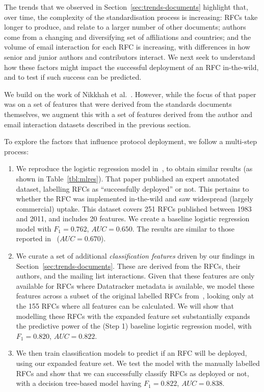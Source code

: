 \documentclass[twocolumn,10pt]{article}
\begin{document}

The trends that we observed in Section~\ref{sec:trends-documents}
highlight that, over time, the complexity of the standardisation process is
increasing: RFCs take longer to produce, and relate to a larger number of
other documents; authors come from a changing and diversifying set of
affiliations and countries; and the volume of email interaction for each
RFC is increasing, with differences in how senior and junior authors and
contributors interact.  We next seek to understand how these factors might
impact the successful deployment of an RFC in-the-wild, and to test if such
success can be predicted.


We build on the work of Nikkhah et al.~\cite{nikkhah2017statistical}.
However, while the focus of that paper was on a set of features that were
derived from the standards documents themselves, we augment this with a set
of features derived from the author and email interaction datasets
described in the previous section.

To explore the factors that influence protocol deployment, we follow a
multi-step process:
\begin{enumerate}
  \item We reproduce the logistic regression model in~\cite{nikkhah2017statistical},
    to obtain similar results (as shown in Table~\ref{tbl:mlres}).
    That paper published an expert annotated dataset, labelling RFCs as
    ``successfully deployed'' or not. This pertains to whether the RFC was
    implemented in-the-wild and saw widespread (largely commercial) uptake.
    This dataset covers 251 RFCs published between 1983 and 2011, and
    includes 20 features. We create a baseline logistic regression model
    with $F_1 = 0.762$, $\mathit{AUC} = 0.650$. The results are similar to
    those reported in~\cite{nikkhah2017statistical} ($\mathit{AUC} = 0.670$).

  \item We curate a set of additional \emph{classification features} driven
    by our findings in Section~\ref{sec:trends-documents}. These are derived
    from the RFCs, their authors, and the mailing list interactions. Given
    that these features are only available for RFCs where Datatracker
    metadata is available, we model these features across a subset of the
    original labelled RFCs from~\cite{nikkhah2017statistical}, looking only
    at the 155 RFCs where all features can be calculated. We will show that
    modelling these RFCs with the expanded feature set substantially
    expands the predictive power of the (Step 1) baseline logistic
    regression model, with $F_1 = 0.820$, $\mathit{AUC} = 0.822$.

  \item We then train classification models to predict if an RFC will be
    deployed, using our expanded feature set.  We test the model with the
    manually labelled RFCs and show that we can successfully classify
    RFCs as deployed or not, with a decision tree-based model having
    $F_1 = 0.822$, $\mathit{AUC} = 0.838$. 
\end{enumerate}
\end{document}
